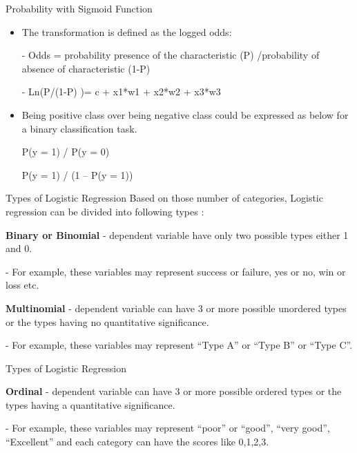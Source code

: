 \documentclass[aspectratio=169,14pt,usenames,dvipsnames]{beamer}
\begin{document}
\begin{frame}{Probability with Sigmoid Function}
\begin{itemize}
\item The transformation is defined as the logged odds:

- Odds = probability presence of the characteristic (P) /probability of absence of characteristic (1-P)

- Ln(P/(1-P) )= c + x1*w1 + x2*w2 + x3*w3 
\end{itemize}
\begin{itemize}
\item Being positive class over being negative class could be expressed as below for a binary classification task.

P(y = 1) / P(y = 0) 

P(y = 1) / (1 – P(y = 1)) 
\end{itemize}

\end{frame}


\begin{frame}{Types of Logistic Regression}
\small{Based on those number of categories, Logistic regression can be divided into following types :}
\begin{itemize}
\small {\item \textbf{Binary or Binomial} - dependent variable have only two possible types either 1 and 0.

- For example, these variables may represent success or failure, yes or no, win or loss etc.}
\end{itemize}
\begin{itemize}
\small {\item \textbf{Multinomial} - dependent variable can have 3 or more possible unordered types or the types having no quantitative significance. 

- For example, these variables may represent “Type A” or “Type B” or “Type C”.}
\end{itemize}
\end{frame}


\begin{frame}{Types of Logistic Regression}
\begin{itemize}
\small{\item \textbf{Ordinal} - dependent variable can have 3 or more possible ordered types or the types having a quantitative significance. }

- For example, these variables may represent “poor” or “good”, “very good”, “Excellent” and each category can have the scores like 0,1,2,3.
\end{itemize}
\end{frame}
	
\end{document}
